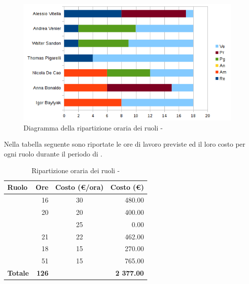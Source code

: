 \documentclass[12pt,a4paper]{article}
\begin{document}
\begin{center}
	\begin{figure}[H]
		\centering
		\includegraphics[width=\textwidth]{../img/diagrammaBarreVerificaValidazioneRotazioneRuoli.png}
		\caption{Diagramma della ripartizione oraria dei ruoli - \FVV{}}
	\end{figure}
\end{center}

\newpage
{}
Nella tabella seguente sono riportate le ore di lavoro previste ed il loro costo per ogni ruolo durante il periodo di \FV.

\begin{table}[H]
	\begin{center}
		\begin{tabular}{l r c r}
			\toprule
			\textbf{Ruolo}	& \textbf{Ore} & \textbf{Costo (\euro/ora)}	& \textbf{Costo (\euro)} \\
			\midrule
			\midrule
			\RE{} & 16 & 30 & 480.00\\
			\midrule
			\AM{} & 20 & 20 & 400.00\\ 
			\midrule
			\AN{} & & 25 & 0.00\\ 
			\midrule
			\PG{} & 21 & 22 & 462.00\\ 
			\midrule
			\PR{} & 18 & 15 & 270.00\\ 
			\midrule
			\VR{} & 51 & 15 & 765.00\\ 
			\midrule
			\textbf{Totale} & \textbf{126} &  & \textbf{2 377.00}\\
			\bottomrule
		\end{tabular}
		\caption{Ripartizione oraria dei ruoli - \FVV{}}
	\end{center}
\end{table}
\end{document}
